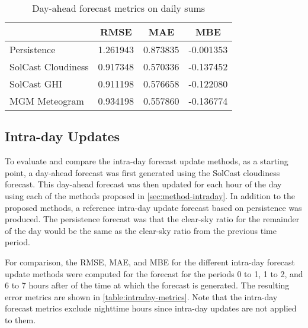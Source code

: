 \begin{table}[!t]
	\centering
	\caption{Day-ahead forecast metrics on daily sums}
	\label{table:dayahead-metrics-sum}
	\begin{tabular}{lS[table-format=1.3]S[table-format=1.3]S[table-format=-1.3]}
		\toprule
		                       &   {RMSE}   &   {MAE}    &    {MBE}    \\
        \midrule
		Persistence & 1.261943 & 0.873835 & -0.001353 \\
		SolCast Cloudiness & 0.917348 & 0.570336 & -0.137452 \\
		SolCast GHI & 0.911198 & 0.576658 & -0.122080 \\
		MGM Meteogram & 0.934198 & 0.557860 & -0.136774 \\
		\bottomrule
	\end{tabular}
\end{table}


\subsection{Intra-day Updates}

To evaluate and compare the intra-day forecast update methods,
as a starting point, a day-ahead forecast was first generated using the
SolCast cloudiness forecast.
This day-ahead forecast was then updated for each hour of the day using each of the methods proposed in \cref{sec:method-intraday}.
In addition to the proposed methods, a reference intra-day update forecast based on persistence was produced.
The persistence forecast was that the clear-sky ratio for the remainder of the day would be the same as the clear-sky ratio from the previous time period.

For comparison, the RMSE, MAE, and MBE for the different intra-day forecast update methods were computed
for the forecast for the periods 0 to 1, 1 to 2, and 6 to 7 hours after of the time at which the forecast is generated.
The resulting error metrics are shown in \cref{table:intraday-metrics}.
Note that the intra-day forecast metrics exclude nighttime hours since intra-day updates are not applied to them.

